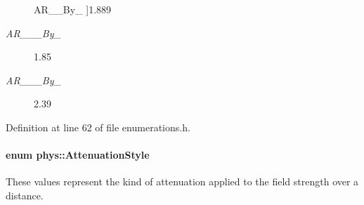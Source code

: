 \begin{Desc}
\begin{description}
{\hypertarget{namespacephys_aa48055a9624c26d73f77ca67499c7aeda7402aa5b653dbe3ac902bd4c88f28634}{
AR\_\_\-By\_}
\label{namespacephys_aa48055a9624c26d73f77ca67499c7aeda7402aa5b653dbe3ac902bd4c88f28634}
}]1.889 \item[{\em 
\hypertarget{namespacephys_aa48055a9624c26d73f77ca67499c7aeda5ddf9db3420597cc625cdae1f2c3308a}{
AR\_\-1\_\-85\_\-By\_\-1}
\label{namespacephys_aa48055a9624c26d73f77ca67499c7aeda5ddf9db3420597cc625cdae1f2c3308a}
}]1.85 \item[{\em 
\hypertarget{namespacephys_aa48055a9624c26d73f77ca67499c7aeda8f306098ebf907f3bede3c99d4ec41b9}{
AR\_\-2\_\-39\_\-By\_\-1}
\label{namespacephys_aa48055a9624c26d73f77ca67499c7aeda8f306098ebf907f3bede3c99d4ec41b9}
}]2.39 \end{description}
\end{Desc}



Definition at line 62 of file enumerations.h.

\hypertarget{namespacephys_ad4ce7ee5c1cc164f2ea3d5f28211739f}{
\paragraph[{AttenuationStyle}]{\setlength{\rightskip}{0pt plus 5cm}enum {\bf phys::AttenuationStyle}}\hfill}
\label{namespacephys_ad4ce7ee5c1cc164f2ea3d5f28211739f}


These values represent the kind of attenuation applied to the field strength over a distance. 

